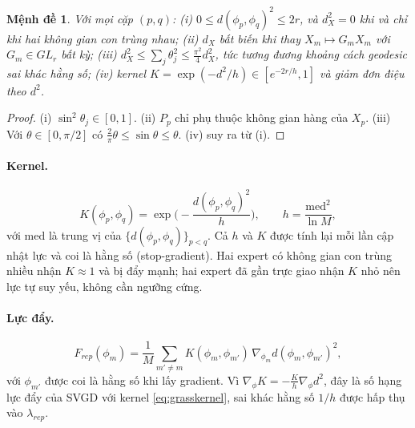 \documentclass[12pt,a4paper]{article}
\theoremstyle{plain}
\newtheorem{proposition}{Mệnh đề}
\begin{document}
\begin{proposition}
\label{prop:bound}
Với mọi cặp $(p,q)$: (i) $0\le d(\phi_p,\phi_q)^2\le 2r$, và $d_X^2=0$ khi và chỉ khi hai không gian con trùng nhau; (ii) $d_X$ bất biến khi thay $X_m\mapsto G_mX_m$ với $G_m\in GL_r$ bất kỳ; (iii) $d_X^2\le\sum_j\theta_j^2\le\frac{\pi^2}{4}d_X^2$, tức tương đương khoảng cách geodesic sai khác hằng số; (iv) kernel $K=\exp(-d^2/h)\in[e^{-2r/h},1]$ và giảm đơn điệu theo $d^2$.
\end{proposition}
\begin{proof}
(i) $\sin^2\theta_j\in[0,1]$. (ii) $P_p$ chỉ phụ thuộc không gian hàng của $X_p$. (iii) Với $\theta\in[0,\pi/2]$ có $\frac2\pi\theta\le\sin\theta\le\theta$. (iv) suy ra từ (i).
\end{proof}

\paragraph{Kernel.}
\begin{equation}
\label{eq:grasskernel}
K(\phi_p,\phi_q)=\exp\!\Big(-\frac{d(\phi_p,\phi_q)^2}{h}\Big),\qquad h=\frac{\mathrm{med}^2}{\ln M},
\end{equation}
với $\mathrm{med}$ là trung vị của $\{d(\phi_p,\phi_q)\}_{p<q}$. Cả $h$ và $K$ được tính lại mỗi lần cập nhật lực và coi là hằng số (stop-gradient). Hai expert có không gian con trùng nhiều nhận $K\approx1$ và bị đẩy mạnh; hai expert đã gần trực giao nhận $K$ nhỏ nên lực tự suy yếu, không cần ngưỡng cứng.

\paragraph{Lực đẩy.}
\begin{equation}
\label{eq:repforce}
F_{rep}(\phi_m)=\frac1M\sum_{m'\ne m}K(\phi_m,\phi_{m'})\,\nabla_{\phi_m}d(\phi_m,\phi_{m'})^2 ,
\end{equation}
với $\phi_{m'}$ được coi là hằng số khi lấy gradient. Vì $\nabla_\phi K=-\frac Kh\nabla_\phi d^2$, đây là số hạng lực đẩy của SVGD với kernel \eqref{eq:grasskernel}, sai khác hằng số $1/h$ được hấp thụ vào $\lambda_{rep}$.
\end{document}
